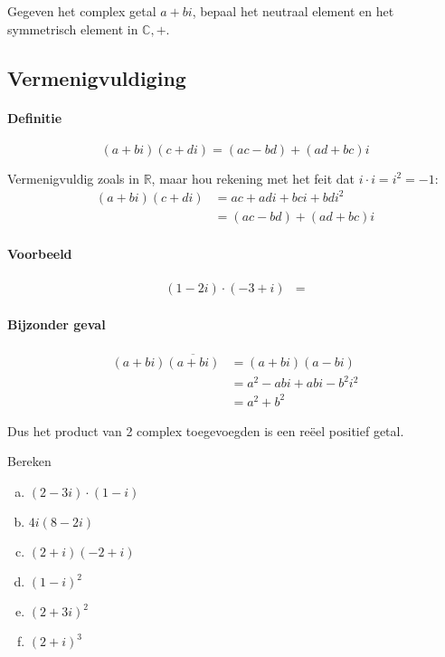 \documentclass[12pt,twoside]{article}
\begin{document}
\begin{oefening}
  Gegeven het complex getal $a+bi$, bepaal het neutraal element en het symmetrisch element in $\mathbb{C}, +$.
\end{oefening}

\subsection{Vermenigvuldiging}

\paragraph*{Definitie}
\begin{mdframed}
$$(a+bi)(c+di) = (ac - bd) + (ad + bc)i$$
\end{mdframed}

Vermenigvuldig zoals in $\mathbb{R}$, maar hou rekening met het feit dat $i\cdot i=i^2=-1$:
\begin{align*}
  (a+bi)(c+di) &= ac + adi + bci + bdi^2\\
               &= (ac - bd) + (ad + bc)i
\end{align*}

\paragraph*{Voorbeeld}
\begin{align*}
  (1-2i)\cdot(-3+i) &= 
\end{align*}

\paragraph*{Bijzonder geval}
\begin{align*}
  (a+bi)\overline{(a+bi)} &= (a+bi)(a-bi) \\
                          &= a^2 - abi + abi - b^2i^2 \\
                          &= a^2 + b^2
\end{align*}

Dus het product van 2 complex toegevoegden is een reëel positief getal.


\begin{oefening}
  Bereken
  \begin{multicols}{2}
  \begin{enumerate}[(a)]
  \itemsep1em
  \item $\displaystyle (2-3i)\cdot (1-i)$
  \item $\displaystyle 4i(8-2i)$
  \item $\displaystyle (2+i)(-2+i)$
  \item $\displaystyle (1-i)^2$
  \item $\displaystyle (2+3i)^2$
  \item $\displaystyle (2+i)^3$
  \end{enumerate}
  \end{multicols}
\end{oefening}
\end{document}

